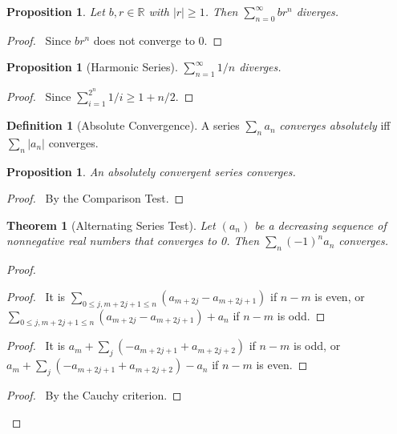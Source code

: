 \documentclass{article}
\let\qed\relax
\newtheorem{proposition}[axiom]{Proposition}
\newtheorem{theorem}[axiom]{Theorem}
\theoremstyle{definition}
\newtheorem{definition}[axiom]{Definition}
\begin{document}
\begin{proposition}
    Let $b, r \in \mathbb{R}$ with $|r| \geq 1$. Then $\sum_{n=0}^\infty b r^n$ diverges.
\end{proposition}

\begin{proof}
    \pf\ Since $br^n$ does not converge to 0. \qed
\end{proof}

\begin{proposition}[Harmonic Series]
    $\sum_{n=1}^\infty 1/n$ diverges.
\end{proposition}

\begin{proof}
    \pf\ Since $\sum_{i=1}^{2^n} 1/i \geq 1 + n/2$. \qed
\end{proof}

\begin{definition}[Absolute Convergence]
    A series $\sum_n a_n$ \emph{converges absolutely} iff $\sum_n |a_n|$ converges.
\end{definition}

\begin{proposition}
    An absolutely convergent series converges.
\end{proposition}

\begin{proof}
    \pf\ By the Comparison Test. \qed
\end{proof}

\begin{theorem}[Alternating Series Test]
    Let $(a_n)$ be a decreasing sequence of nonnegative real numbers that converges to 0. Then $\sum_n (-1)^n a_n$ converges.
\end{theorem}

\begin{proof}
    \pf
    \begin{proof}
        \pf\ It is $\sum_{0 \leq j, m + 2j + 1 \leq n} (a_{m+2j} - a_{m+2j+1})$ if $n-m$ is even, or
        $\sum_{0 \leq j, m + 2j + 1 \leq n} (a_{m+2j} - a_{m + 2j + 1}) + a_n$ if $n-m$ is odd.
    \end{proof}
    \begin{proof}
        \pf\ It is $a_m + \sum_j (-a_{m + 2j + 1} + a_{m + 2j + 2})$ if $n - m$ is odd, or
        $a_m + \sum_j(-a_{m+2j+1} + a_{m+2j+2}) - a_n$ if $n-m$ is even.
    \end{proof}
    \qedstep
    \begin{proof}
        \pf\ By the Cauchy criterion.
    \end{proof}
    \qed
\end{proof}
\end{document}
